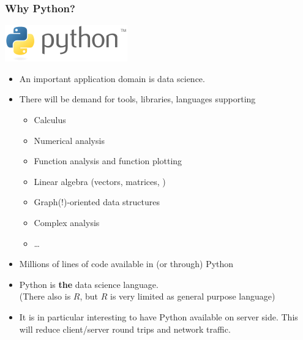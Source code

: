 \documentclass[mathserif]{beamer}
\begin{document}
\begin{frame}[shrink]
\frametitle{Why Python?}
\includegraphics[width=0.2\linewidth]{pythonlogo.png}
\begin{itemize}
\item An important application domain is data science.
\item There will be demand for tools, libraries, languages supporting
\begin{itemize}
\item Calculus
\item Numerical analysis
\item Function analysis and function plotting
\item Linear algebra (vectors, matrices, \etc)
\item Graph(!)-oriented data structures
\item Complex analysis
\item \dots
\end{itemize}
\item Millions of lines of code available in (or through) Python
\item Python is \textbf{the} data science language.\\
      (There also is $R$, but $R$ is very limited as general purpose language)
\item It is in particular interesting to have Python available
      on server side.
      This will reduce client/server round trips
      and network traffic.
\end{itemize}
\end{frame}
\end{document}
